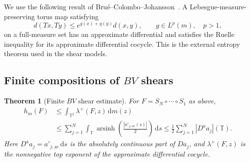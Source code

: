 \documentclass[review,12pt,times,a4paper,nopreprintline]{elsarticle}
\theoremstyle{plain}
\newtheorem{theorem}{Theorem}[section]
\theoremstyle{definition}
\theoremstyle{remark}
\newcommand{\T}{\mathbb T}
\newcommand{\dd}{\,\mathrm d}
\newcommand{\arsinh}{\operatorname{arsinh}}
\numberwithin{equation}{section}
\begin{document}
We use the following result of Bru\'e--Colombo--Johansson~\cite[Theorem 5.2]{BCJ}. A Lebesgue-measure-preserving torus map satisfying
\begin{equation}\label{eq:singularruellehyp}
 d(Tx,Ty)\leq e^{g(x)+g(y)}d(x,y),\qquad
 g\in L^p(m),\quad p>1,
\end{equation}
on a full-measure set has an approximate differential and satisfies the Ruelle inequality for its approximate differential cocycle. This is the external entropy theorem used in the shear models.

\subsection{Finite compositions of \texorpdfstring{$BV$}{BV} shears}
\begin{theorem}[Finite $BV$ shear estimate]\label{thm:finiteshear}
For $F=S_N\circ\cdots\circ S_1$ as above,
\begin{equation}\label{eq:finiteshear}
 \begin{split}
 h_m(F)&\leq\int_{\T^2}\lambda^+(F,z)\dd m(z)\\
 &\leq\sum_{j=1}^N\int_{\T}
 \arsinh\!\left(\frac{|a'_{j,\mathrm{ac}}(s)|}{2}\right)\dd s
 \leq\frac12\sum_{j=1}^N|D^aa_j|(\T).
 \end{split}
\end{equation}
Here $D^aa_j=a'_{j,\mathrm{ac}}\dd s$ is the absolutely continuous part of $Da_j$, and $\lambda^+(F,z)$ is the nonnegative top exponent of the approximate differential cocycle.
\end{theorem}
\end{document}
